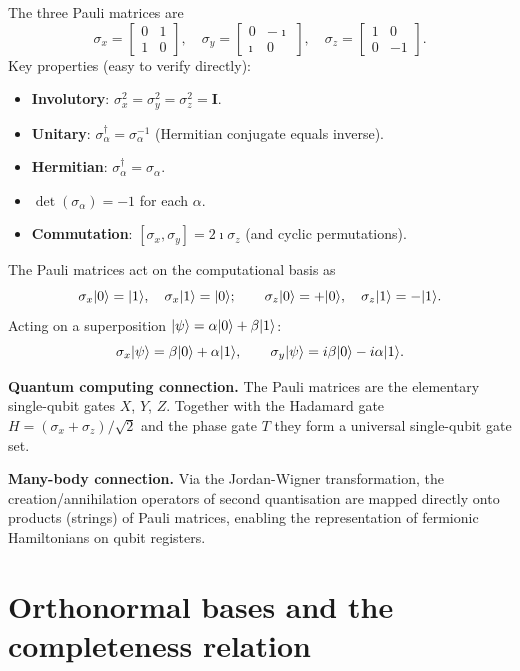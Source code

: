 The three Pauli matrices are
\[
  \sigma_x = \begin{bmatrix}0&1\\1&0\end{bmatrix},\quad
  \sigma_y = \begin{bmatrix}0&-\imath\\\imath&0\end{bmatrix},\quad
  \sigma_z = \begin{bmatrix}1&0\\0&-1\end{bmatrix}.
\]
Key properties (easy to verify directly):
\begin{itemize}
  \item \textbf{Involutory}: $\sigma_x^2=\sigma_y^2=\sigma_z^2=\bm{I}$.
  \item \textbf{Unitary}: $\sigma_\alpha^\dagger=\sigma_\alpha^{-1}$
        (Hermitian conjugate equals inverse).
  \item \textbf{Hermitian}: $\sigma_\alpha^\dagger=\sigma_\alpha$.
  \item $\det(\sigma_\alpha)=-1$ for each $\alpha$.
  \item \textbf{Commutation}: $[\sigma_x,\sigma_y]=2\imath\sigma_z$
        (and cyclic permutations).
\end{itemize}

The Pauli matrices act on the computational basis as
\[
  \sigma_x\vert 0 \rangle=\vert 1 \rangle,\quad
  \sigma_x\vert 1 \rangle=\vert 0 \rangle;
  \qquad
  \sigma_z\vert 0 \rangle=+\vert 0 \rangle,\quad
  \sigma_z\vert 1 \rangle=-\vert 1 \rangle.
\]
Acting on a superposition $\vert \psi \rangle=\alpha\vert 0 \rangle+\beta\vert 1 \rangle$:
\[
  \sigma_x\vert \psi \rangle=\beta\vert 0 \rangle+\alpha\vert 1 \rangle,\qquad
  \sigma_y\vert \psi \rangle=i\beta\vert 0 \rangle-i\alpha\vert 1 \rangle.
\]

\begin{notebox}
\textbf{Quantum computing connection.} The Pauli matrices are the
elementary single-qubit gates $X$, $Y$, $Z$.  Together with the
Hadamard gate $H=(\sigma_x+\sigma_z)/\sqrt{2}$ and the phase gate $T$
they form a universal single-qubit gate set.

\textbf{Many-body connection.} Via the Jordan-Wigner transformation,
the creation/annihilation operators of second quantisation are mapped
directly onto products (strings) of Pauli matrices, enabling the
representation of fermionic Hamiltonians on qubit registers.
\end{notebox}

\section{Orthonormal bases and the completeness relation}
\label{sec:onb}

